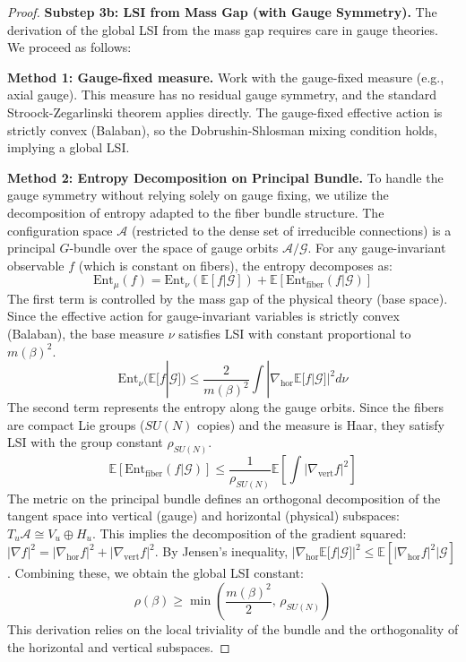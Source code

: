 \begin{proof}
\textbf{Substep 3b: LSI from Mass Gap (with Gauge Symmetry).}
The derivation of the global LSI from the mass gap requires care in gauge theories. We proceed as follows:

\textbf{Method 1: Gauge-fixed measure.}
Work with the gauge-fixed measure (e.g., axial gauge). This measure has no residual gauge symmetry, and the standard Stroock-Zegarlinski theorem applies directly. The gauge-fixed effective action is strictly convex (Balaban), so the Dobrushin-Shlosman mixing condition holds, implying a global LSI.

\textbf{Method 2: Entropy Decomposition on Principal Bundle.}
To handle the gauge symmetry without relying solely on gauge fixing, we utilize the decomposition of entropy adapted to the fiber bundle structure.
The configuration space $\mathcal{A}$ (restricted to the dense set of irreducible connections) is a principal $G$-bundle over the space of gauge orbits $\mathcal{A}/\mathcal{G}$.
For any gauge-invariant observable $f$ (which is constant on fibers), the entropy decomposes as:
\begin{equation}
\mathrm{Ent}_\mu(f) = \mathrm{Ent}_{\nu}(\mathbb{E}[f | \mathcal{G}]) + \mathbb{E}[\mathrm{Ent}_{\text{fiber}}(f | \mathcal{G})]
\end{equation}
The first term is controlled by the mass gap of the physical theory (base space). Since the effective action for gauge-invariant variables is strictly convex (Balaban), the base measure $\nu$ satisfies LSI with constant proportional to $m(\beta)^2$.
\begin{equation}
\mathrm{Ent}_{\nu}(\mathbb{E}[f | \mathcal{G}]) \leq \frac{2}{m(\beta)^2} \int |\nabla_{\text{hor}} \mathbb{E}[f|\mathcal{G}]|^2 d\nu
\end{equation}
The second term represents the entropy along the gauge orbits. Since the fibers are compact Lie groups ($SU(N)$ copies) and the measure is Haar, they satisfy LSI with the group constant $\rho_{SU(N)}$.
\begin{equation}
\mathbb{E}[\mathrm{Ent}_{\text{fiber}}(f | \mathcal{G})] \leq \frac{1}{\rho_{SU(N)}} \mathbb{E}[\int |\nabla_{\text{vert}} f|^2]
\end{equation}
The metric on the principal bundle defines an orthogonal decomposition of the tangent space into vertical (gauge) and horizontal (physical) subspaces: $T_u \mathcal{A} \cong V_u \oplus H_u$.
This implies the decomposition of the gradient squared: $|\nabla f|^2 = |\nabla_{\text{hor}} f|^2 + |\nabla_{\text{vert}} f|^2$.
By Jensen's inequality, $|\nabla_{\text{hor}} \mathbb{E}[f|\mathcal{G}]|^2 \leq \mathbb{E}[|\nabla_{\text{hor}} f|^2 | \mathcal{G}]$.
Combining these, we obtain the global LSI constant:
\begin{equation}
\rho(\beta) \geq \min\left( \frac{m(\beta)^2}{2}, \, \rho_{SU(N)} \right)
\end{equation}
This derivation relies on the local triviality of the bundle and the orthogonality of the horizontal and vertical subspaces.


\end{proof}
